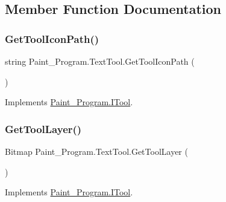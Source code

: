 \subsection{Member Function Documentation}
\mbox{\label{class_paint___program_1_1_text_tool_a0adfe4c942f7d97c2d9cf626fb3b78c7}} 
\subsubsection{\texorpdfstring{Get\+Tool\+Icon\+Path()}{GetToolIconPath()}}
{\footnotesize\ttfamily string Paint\+\_\+\+Program.\+Text\+Tool.\+Get\+Tool\+Icon\+Path (\begin{DoxyParamCaption}{ }\end{DoxyParamCaption})\hspace{0.3cm}{\ttfamily [inline]}}



Implements \mbox{\hyperlink{interface_paint___program_1_1_i_tool_aa057d2f99c59d7bec0215dcad2da1b72}{Paint\+\_\+\+Program.\+I\+Tool}}.

\mbox{\label{class_paint___program_1_1_text_tool_acb2114b449f982664f1fd49e3bb0b017}} 
\subsubsection{\texorpdfstring{Get\+Tool\+Layer()}{GetToolLayer()}}
{\footnotesize\ttfamily Bitmap Paint\+\_\+\+Program.\+Text\+Tool.\+Get\+Tool\+Layer (\begin{DoxyParamCaption}{ }\end{DoxyParamCaption})\hspace{0.3cm}{\ttfamily [inline]}}



Implements \mbox{\hyperlink{interface_paint___program_1_1_i_tool_a9b057905515f42a988c166a6a40318e0}{Paint\+\_\+\+Program.\+I\+Tool}}.


